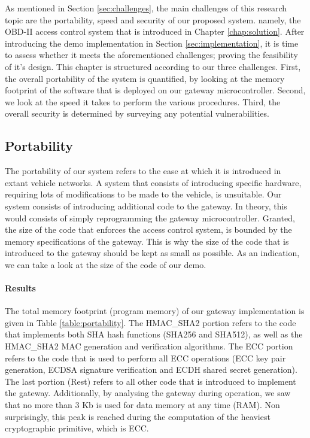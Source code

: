 As mentioned in Section \ref{sec:challenges}, the main challenges of this research topic are the portability, speed and security of our proposed system. namely, the OBD-II access control system that is introduced in Chapter \ref{chap:solution}. After introducing the demo implementation in Section \ref{sec:implementation}, it is time to assess whether it meets the aforementioned challenges; proving the feasibility of it's design. This chapter is structured according to our three challenges. First, the overall portability of the system is quantified, by looking at the memory footprint of the software that is deployed on our gateway microcontroller. Second,  we look at the speed it takes to perform the various procedures. Third, the overall security is determined by surveying any potential vulnerabilities. 

\subsection{Portability}
\label{sec:portability}

The portability of our system refers to the ease at which it is introduced in extant vehicle networks. A system that consists of introducing specific hardware, requiring lots of modifications to be made to the vehicle, is unsuitable. Our system consists of introducing additional code to the gateway. In theory, this would consists of simply reprogramming the gateway microcontroller. Granted, the size of the code that enforces the access control system, is bounded by the memory specifications of the gateway. This is why the size of the code that is introduced to the gateway should be kept as small as possible. As an indication, we can take a look at the size of the code of our demo. 

\paragraph{Results}
The total memory footprint (program memory) of our gateway implementation is given in Table \ref{table:portability}. The HMAC\_SHA2 portion refers to the code that implements both SHA hash functions (SHA256 and SHA512), as well as the HMAC\_SHA2 MAC generation and verification algorithms. The ECC portion refers to the code that is used to perform all ECC operations (ECC key pair generation, ECDSA signature verification and ECDH shared secret generation). The last portion (Rest) refers to all other code that is introduced to implement the gateway. Additionally, by analysing the gateway during operation, we saw that no more than 3 Kb is used for data memory at any time (RAM). Non surprisingly, this peak is reached during the computation of the heaviest cryptographic primitive, which is ECC.

